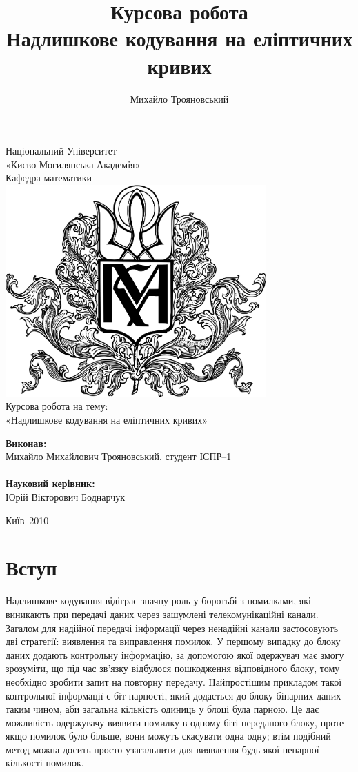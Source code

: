\documentclass[a4paper,12pt,oneside]{article}
\title{Курсова робота\\Надлишкове кодування на еліптичних кривих}
\author{Михайло Трояновський}
\begin{document}
\begin{titlepage}
\begin{center}
Національний Університет\\ «Києво-Могилянська Академія»\\
        Кафедра математики\\
        \vskip 3cm
        \includegraphics[width=100mm]{kma}\\
                               \vskip 1cm
{\Large
    Курсова робота на тему:\\
        «Надлишкове кодування на еліптичних кривих»
}
\vskip 1cm
\textwidth
\begin{minipage}{0.5\textwidth}
\textbf{Виконав:}\\
        Михайло Михайлович Трояновський, студент ІСПР–1\\
        \\
        \textbf{Науковий керівник:}\\
        Юрій Вікторович Боднарчук
        \end{minipage}
        \vfill
        Київ–2010
        \end{center}
        \end{titlepage}


\tableofcontents
\pagebreak

\section{Вступ}
Надлишкове кодування відіграє значну роль у боротьбі з помилками, які виникають при передачі даних через зашумлені телекомунікаційні канали. 
Загалом для надійної передачі інформації через ненадійні канали застосовують дві стратегії: виявлення та виправлення помилок. 
У першому випадку до блоку даних додають контрольну інформацію, за допомогою якої одержувач має змогу зрозуміти, 
що під час зв'язку відбулося пошкодження відповідного блоку, тому необхідно зробити запит на повторну передачу. 
Найпростішим прикладом такої контрольної інформації є біт парності, який додається до блоку бінарних даних таким чином, аби загальна кількість одиниць у блоці була парною. 
Це дає можливість одержувачу виявити помилку в одному біті переданого блоку, проте якщо помилок було більше, вони можуть скасувати одна одну; 
втім подібний метод можна досить просто узагальнити для виявлення будь-якої непарної кількості помилок.
\end{document}
